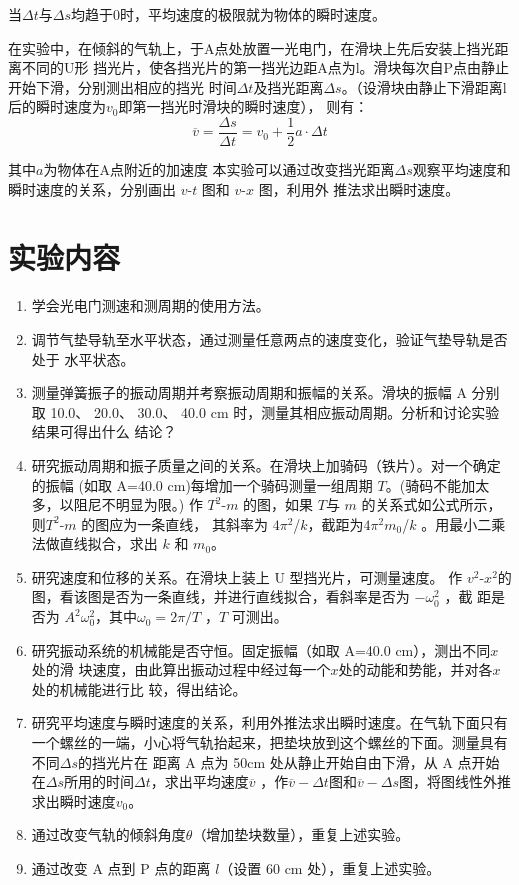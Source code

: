 \documentclass[UTF8]{article}
\theoremstyle{MyLineTheoremStyle} %
\theoremstyle{MyBlockTheoremStyle} %
\theoremstyle{MySubsubsectionStyle} %
\begin{document}
当$\Delta t$与$\Delta s$均趋于0时，平均速度的极限就为物体的瞬时速度。

在实验中，在倾斜的气轨上，于A点处放置一光电门，在滑块上先后安装上挡光距离不同的U形
挡光片，使各挡光片的第一挡光边距A点为l。滑块每次自P点由静止开始下滑，分别测出相应的挡光
时间$\Delta t$及挡光距离$\Delta s$。（设滑块由静止下滑距离l后的瞬时速度为$v_0$即第一挡光时滑块的瞬时速度），
则有：
\begin{equation}
    \overline v  = \frac{{\Delta s}}{{\Delta t}} = {v_0} + \frac{1}{2}a \cdot \Delta t
\end{equation}

其中$a$为物体在A点附近的加速度
本实验可以通过改变挡光距离$\Delta s$观察平均速度和瞬时速度的关系，分别画出 $v$-$t$ 图和 $v$-$x$ 图，利用外
推法求出瞬时速度。

\section{实验内容}

\begin{enumerate}
\item 学会光电门测速和测周期的使用方法。
\item 调节气垫导轨至水平状态，通过测量任意两点的速度变化，验证气垫导轨是否处于
水平状态。
\item 测量弹簧振子的振动周期并考察振动周期和振幅的关系。滑块的振幅 A 分别取
10.0、 20.0、 30.0、 40.0 cm 时，测量其相应振动周期。分析和讨论实验结果可得出什么
结论？ 
\item 研究振动周期和振子质量之间的关系。在滑块上加骑码（铁片）。对一个确定的振幅
(如取 A=40.0 cm)每增加一个骑码测量一组周期 $T$。(骑码不能加太多，以阻尼不明显为限。) 
作 $T^2$-$m$ 的图，如果 $T$与 $m$ 的关系式如公式所示，则$T^2$-$m$ 的图应为一条直线，
其斜率为 $4$$\pi^2$/$k$，截距为$4$$\pi^2$$m_0$/$k$ 。用最小二乘法做直线拟合，求出 $k$ 和 $m_0$。
\item 研究速度和位移的关系。在滑块上装上 U 型挡光片，可测量速度。
作 $v^2$-$x^2$的图，看该图是否为一条直线，并进行直线拟合，看斜率是否为 $-\omega_0^2$ ，截
距是否为 $A^2$$\omega_0^2$，其中$\omega_0=2\pi /T $ ，$T$ 可测出。
\item 研究振动系统的机械能是否守恒。固定振幅（如取 A=40.0 cm），测出不同$x$处的滑
块速度，由此算出振动过程中经过每一个$x$处的动能和势能，并对各$x$处的机械能进行比
较，得出结论。
\item 研究平均速度与瞬时速度的关系，利用外推法求出瞬时速度。在气轨下面只有一个螺丝的一端，小心将气轨抬起来，把垫块放到这个螺丝的下面。测量具有不同$\Delta s$的挡光片在
距离 A 点为 50cm 处从静止开始自由下滑，从 A 点开始在$\Delta s$所用的时间$\Delta t$，求出平均速度$\overline{v}$ ，作$\overline{v}-\Delta t$图和$\overline{v}-\Delta s $图，将图线性外推求出瞬时速度$v_0$。
\item 通过改变气轨的倾斜角度$\theta $（增加垫块数量），重复上述实验。
\item 通过改变 A 点到 P 点的距离 $l$（设置 60 cm 处），重复上述实验。

\end{enumerate}
\end{document}
